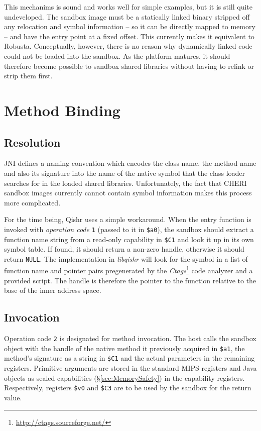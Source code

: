 \documentclass[a4paper,12pt,twoside,openright]{report}
\newcommand{\reg}[1]{\texttt{\$#1}}
\newcommand{\tool}[1]{\emph{#1}}
\newcommand{\lib}[1]{\tool{lib#1}}
\begin{document}
This mechanims is sound and works well for simple examples, but it is still quite undeveloped. The sandbox image must be a statically linked binary stripped off any relocation and symbol information -- so it can be directly mapped to memory -- and have the entry point at a fixed offset. This currently makes it equivalent to Robusta. Conceptually, however, there is no reason why dynamically linked code could not be loaded into the sandbox. As the platform matures, it should therefore become possible to sandbox shared libraries without having to relink or strip them first.

\section{Method Binding}

\subsection{Resolution}

JNI defines a naming convention which encodes the class name, the method name and also its signature into the name of the native symbol that the class loader searches for in the loaded shared libraries. Unfortunately, the fact that CHERI sandbox images currently cannot contain symbol information makes this process more complicated.

For the time being, Qishr uses a simple workaround. When the entry function is invoked with \emph{operation code} \texttt{1} (passed to it in \reg{a0}), the sandbox should extract a function name string from a read-only capability in \reg{C1} and look it up in its own symbol table. If found, it should return a non-zero handle, otherwise it should return \texttt{NULL}. The implementation in \lib{qishr} will look for the symbol in a list of function name and pointer pairs pregenerated by the \tool{Ctags}\footnote{\url{http://ctags.sourceforge.net/}} code analyzer and a provided script. The handle is therefore the pointer to the function relative to the base of the inner address space.

\subsection{Invocation}

Operation code \texttt{2} is designated for method invocation. The host calls the sandbox object with the handle of the native method it previously acquired in \reg{a1}, the method's signature as a string in \reg{C1} and the actual parameters in the remaining registers. Primitive arguments are stored in the standard MIPS registers and Java objects as sealed capabilities (\S\ref{sec:MemorySafety}) in the capability registers. Respectively, registers \reg{v0} and \reg{C3} are to be used by the sandbox for the return value.
\end{document}
